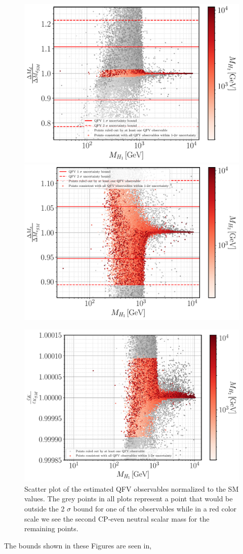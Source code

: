 \begin{figure}[H]\ContinuedFloat
    \centering
	\includegraphics[width=.49\textwidth]{Images/3HDM/Reds/DeltaMd_H1_H2.pdf}
    \includegraphics[width=.49\textwidth]{Images/3HDM/Reds/DeltaMs_H1_H2.pdf}
\end{figure}
\begin{figure}[H]\ContinuedFloat
    \centering
    \includegraphics[width=.49\textwidth]{Images/3HDM/Reds/Eps_K_H1_H2_Centered.pdf}
	\caption{ Scatter plot of the estimated QFV observables normalized to the SM values. The grey points in all plots represent a point that would be outside the 2 $\sigma$ bound for one of the observables while in a red color scale we see the second CP-even neutral scalar mass for the remaining points.  }
	\label{fig:3HDM_Flavour}
\end{figure}

The bounds shown in these Figures are seen in, 

